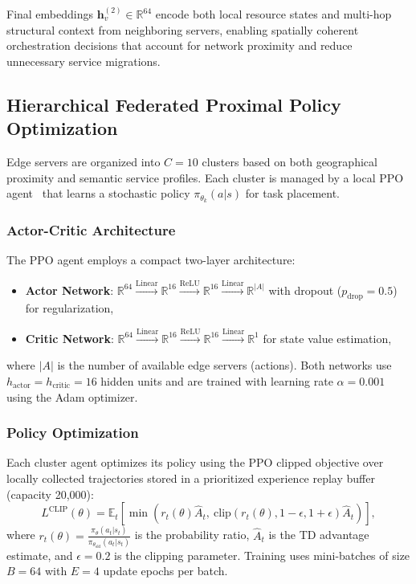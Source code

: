 Final embeddings $\mathbf{h}_v^{(2)} \in \mathbb{R}^{64}$ encode both local resource states and multi-hop structural context from neighboring servers, enabling spatially coherent orchestration decisions that account for network proximity and reduce unnecessary service migrations.

\subsection{Hierarchical Federated Proximal Policy Optimization}
\label{subsec:hierarchical_ppo}

Edge servers are organized into $C = 10$ clusters based on both geographical proximity and semantic service profiles. Each cluster is managed by a local PPO agent~\cite{Schulman2017_PPO} that learns a stochastic policy $\pi_{\theta_k}(a|s)$ for task placement.

\subsubsection{Actor-Critic Architecture}
The PPO agent employs a compact two-layer architecture:
\begin{itemize}
	\item \textbf{Actor Network}: $\mathbb{R}^{64} \xrightarrow{\text{Linear}} \mathbb{R}^{16} \xrightarrow{\text{ReLU}} \mathbb{R}^{16} \xrightarrow{\text{Linear}} \mathbb{R}^{|A|}$ with dropout ($p_{\text{drop}} = 0.5$) for regularization,
	\item \textbf{Critic Network}: $\mathbb{R}^{64} \xrightarrow{\text{Linear}} \mathbb{R}^{16} \xrightarrow{\text{ReLU}} \mathbb{R}^{16} \xrightarrow{\text{Linear}} \mathbb{R}^{1}$ for state value estimation,
\end{itemize}
where $|A|$ is the number of available edge servers (actions). Both networks use $h_{\text{actor}} = h_{\text{critic}} = 16$ hidden units and are trained with learning rate $\alpha = 0.001$ using the Adam optimizer.

\subsubsection{Policy Optimization}
Each cluster agent optimizes its policy using the PPO clipped objective over locally collected trajectories stored in a prioritized experience replay buffer (capacity 20,000):
\begin{equation}
	L^{\text{CLIP}}(\theta) = \mathbb{E}_t \left[ \min \left( r_t(\theta)\hat{A}_t, \ \text{clip}(r_t(\theta), 1-\epsilon, 1+\epsilon)\hat{A}_t \right) \right],
\end{equation}
where $r_t(\theta) = \frac{\pi_\theta(a_t|s_t)}{\pi_{\theta_{\text{old}}}(a_t|s_t)}$ is the probability ratio, $\hat{A}_t$ is the TD advantage estimate, and $\epsilon = 0.2$ is the clipping parameter. Training uses mini-batches of size $B = 64$ with $E = 4$ update epochs per batch.

